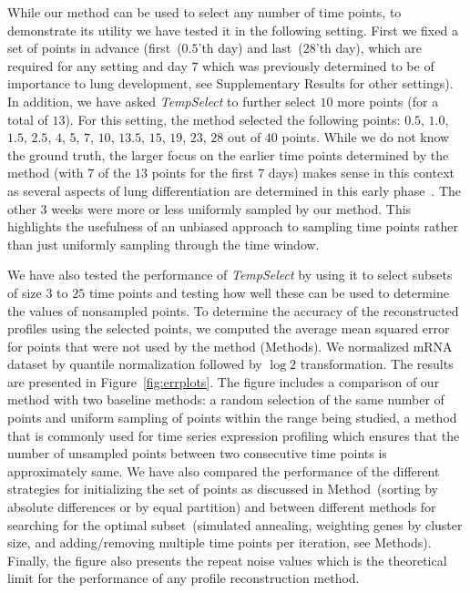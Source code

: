 \documentclass[10pt]{article}
\newcommand{\Tempselect}{\textit{TempSelect}\xspace}
\begin{document}
While our method can be used to select any number of time points, to demonstrate its utility we have tested it
in the following setting. First we fixed a set of points in advance (first~($0.5$'th day) and
last~($28$'th day), which are required for any setting and day $7$ which was
previously determined to be of importance to lung development, see
Supplementary Results for other settings). In addition, we have asked
\Tempselect to further select $10$ more points (for a total of $13$). For
this setting, the method selected the following points: $0.5$,
$1.0$, $1.5$, $2.5$, $4$, $5$, $7$, $10$, $13.5$, $15$, $19$, $23$,
$28$ out of $40$ points. While we do not know the ground truth, the larger focus on the
earlier time points determined by the method (with $7$ of the $13$
points for the first $7$ days) makes sense in this context as several
aspects of lung differentiation are determined in this early phase~\cite{guilliams2013}. The other $3$ weeks were more or less
uniformly sampled by our method. This highlights the usefulness of an unbiased approach to sampling time points rather than just
uniformly sampling through the time window. 

We have also tested the performance of \Tempselect by using it to select
subsets of size $3$ to $25$ time points and testing how well these
can be used to determine the values of nonsampled points. To
determine the accuracy of the reconstructed profiles using the
selected points, we computed the average mean squared error for
points that were not used by the method (Methods). We normalized mRNA dataset by quantile
normalization followed by $\log 2$ transformation. The results are presented in Figure~\ref{fig:errplots}. The figure includes a
comparison of our method with two baseline methods: a random
selection of the same number of points and uniform sampling of
points within the range being studied, a method that is commonly
used for time series expression profiling which ensures that the number of
unsampled points between two consecutive time points is approximately
same. We have also compared the performance of the different strategies
for initializing the set of points as discussed in Method~(sorting
by absolute differences or by equal partition) and between different
methods for searching for the optimal subset~(simulated annealing,
weighting genes by cluster size, and adding/removing multiple time
points per iteration, see Methods). Finally, the figure also
presents the repeat noise values which is the theoretical limit for
the performance of any profile reconstruction method.
\end{document}

